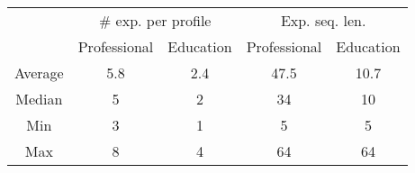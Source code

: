 \begin{table}[ht]
    \centering
    \begin{tabular}{@{}ccccc@{}}
    \multirow{2}{*}{} & \multicolumn{2}{c}{\# exp. per profile} & \multicolumn{2}{c}{Exp. seq. len.} \\
                      &  \small Professional               &   \small Education               &   \small Professional            &   \small Education            \\ \midrule
    Average           & 5.8                        & 2.4                     & 47.5                    & 10.7                 \\
    Median            & 5                          & 2                       & 34                      & 10                   \\
    Min               & 3                          & 1                       & 5                       & 5                    \\
    Max               & 8                          & 4                       & 64                      & 64                   \\ \bottomrule
    \end{tabular}
    \end{table}\label{tab:expRecap}